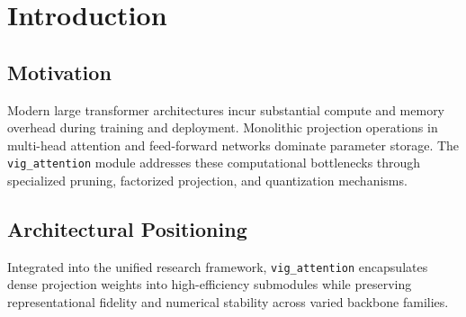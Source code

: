 \section{Introduction}

\subsection{Motivation}
Modern large transformer architectures incur substantial compute and memory overhead during training and deployment. Monolithic projection operations in multi-head attention and feed-forward networks dominate parameter storage. The \texttt{vig_attention} module addresses these computational bottlenecks through specialized pruning, factorized projection, and quantization mechanisms.

\subsection{Architectural Positioning}
Integrated into the unified research framework, \texttt{vig_attention} encapsulates dense projection weights into high-efficiency submodules while preserving representational fidelity and numerical stability across varied backbone families.
